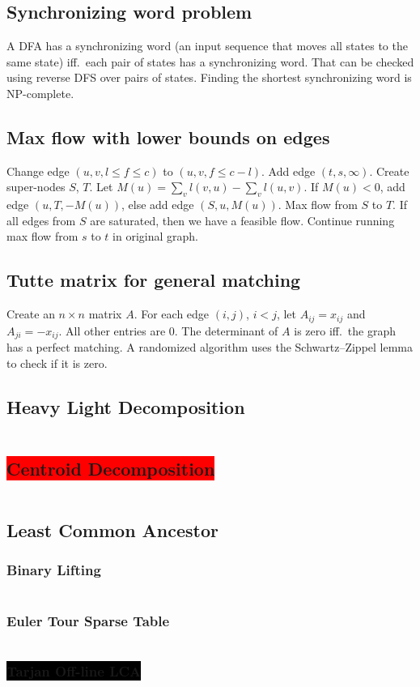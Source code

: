 \documentclass[8pt,a4paper,landscape,oneside]{amsart}
\newcommand{\code}[1]{\inputminted[fontsize=\normalsize,baselinestretch=1]{cpp}{_code/#1}}
\newcommand{\subsectionRed}[1]{\subsection{\colorbox{red}{\color{white}#1}}}
\newcommand{\subsubsectionBlack}[1]{\subsubsection{\colorbox{black}{\color{white}#1}}}
\begin{document}
\begin{multicols*}{3}
  \subsection{Synchronizing word problem}
    A DFA has a synchronizing word (an input sequence that moves all states
    to the same state) iff.\ each pair of states has a synchronizing word.
    That can be checked using reverse DFS over pairs of states. Finding the
    shortest synchronizing word is NP-complete.
  \subsection{Max flow with lower bounds on edges}
    Change edge $(u,v,l\leq f\leq c)$ to $(u,v,f\leq c-l)$. Add edge
    $(t,s,\infty)$. Create super-nodes $S$, $T$. Let $M(u) = \sum_{v}
    l(v,u) - \sum_{v} l(u,v)$. If $M(u)<0$, add edge $(u,T,-M(u))$, else
    add edge $(S,u,M(u))$. Max flow from $S$ to $T$. If all edges from $S$
    are saturated, then we have a feasible flow. Continue running max flow
    from $s$ to $t$ in original graph.
  \subsection{Tutte matrix for general matching}
    Create an $n\times n$ matrix $A$. For each edge $(i,j)$, $i<j$, let
    $A_{ij} = x_{ij}$ and $A_{ji} = -x_{ij}$. All other entries are $0$.
    The determinant of $A$ is zero iff.\ the graph has a perfect matching.
    A randomized algorithm uses the Schwartz--Zippel lemma to check if it is
    zero.
  \subsection{Heavy Light Decomposition}
    \code{graphs/heavy_light_decomposition.cpp}
	\subsectionRed{Centroid Decomposition}
    \code{graphs/centroid_decomposition.cpp}
	\subsection{Least Common Ancestor}
		\subsubsection{Binary Lifting}
      \code{graphs/lca/binary_lifting.cpp}
    \subsubsection{Euler Tour Sparse Table}
      \code{graphs/lca/lca_sparse_table.cpp}
    \subsubsectionBlack{Tarjan Off-line LCA}

\end{multicols*}
\end{document}
